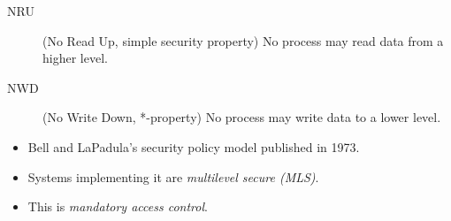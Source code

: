 \begin{frame}
  \begin{definition}
    \begin{description}
      \item[NRU] (No Read Up, simple security property)
        No process may read data from a higher level.
      \item[NWD] (No Write Down, *-property)
        No process may write data to a lower level.
    \end{description}
  \end{definition}
\end{frame}

\begin{frame}
  \begin{remark}
    \begin{itemize}
      \item Bell and LaPadula's security policy model published in 1973.
      \item Systems implementing it are \emph{multilevel secure (MLS)}.
      \item This is \emph{mandatory access control}.
    \end{itemize}
  \end{remark}
\end{frame}


